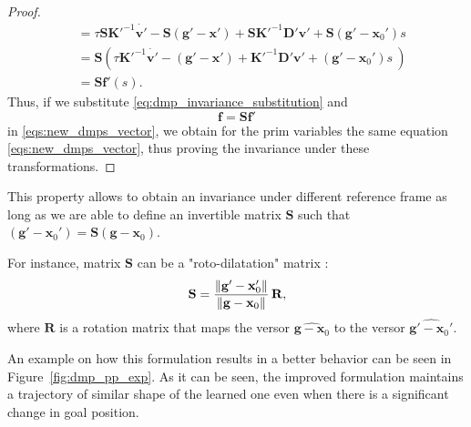 \documentclass[fleqn, 11pt]{article}
\theoremstyle{definition}
\theoremstyle{plain}
\theoremstyle{remark}
\begin{document}
\begin{proof}
\begin{align*}
            & = \tau \mathbf{S} \mathbf{K}'^{-1} \dot{\mathbf{v}'} - \mathbf{S} (\mathbf{g}' - \mathbf{x}') + \mathbf{S} \mathbf{K}'^{-1} \mathbf{D}' \mathbf{v}' + \mathbf{S} (\mathbf{g} ' - \mathbf{x}_0')s \\
            & = \mathbf{S} \left( { \tau \mathbf{K}'^{-1} \dot{\mathbf{v}'} - (\mathbf{g}' - \mathbf{x}') + \mathbf{K}'^{-1} \mathbf{D}' \mathbf{v}' + (\mathbf{g} ' - \mathbf{x}_0')s }\ \right) \\
            & = \mathbf{S} \mathbf{f}'(s).
    \end{align*}
    Thus, if we substitute \eqref{eq:dmp_invariance_substitution} and
    \begin{equation}
        \mathbf{f} = \mathbf{S} \mathbf{f}'
        \label{eq:dmp_invariance_forcing_term}
    \end{equation}
    in \eqref{eqs:new_dmps_vector}, we obtain for the prim variables the same equation \eqref{eqs:new_dmps_vector}, thus proving the invariance under these transformations.
\end{proof}

This property allows to obtain an invariance under different reference frame \cite{GSF21} as long as we are able to define an invertible matrix $ \mathbf{S}$ such that
\( ( \mathbf{g}' - \mathbf{x}_0' ) = \mathbf{S} ( \mathbf{g} - \mathbf{x}_0) . \)

For instance, matrix $ \mathbf{S} $ can be a "roto-dilatation" matrix \cite{GSF21}:
\[ \mathbf{S} = { \left\Vert \mathbf{g}' - \mathbf{x}_0' \right\Vert \over \left\Vert \mathbf{g} - \mathbf{x}_0 \right\Vert  } \, \mathbf{R}, \]
where $ \mathbf{R} $ is a rotation matrix that maps the versor $ \widehat{\mathbf{g} - \mathbf{x}_0} $ to the versor $ \widehat{ \mathbf{g}' - \mathbf{x}_0' } $.

\noindent
An example on how this formulation results in a better behavior can be seen in Figure~\ref{fig:dmp_pp_exp}.
As it can be seen, the improved formulation maintains a trajectory of similar shape of the learned one even when there is a significant change in goal position.
\end{document}
